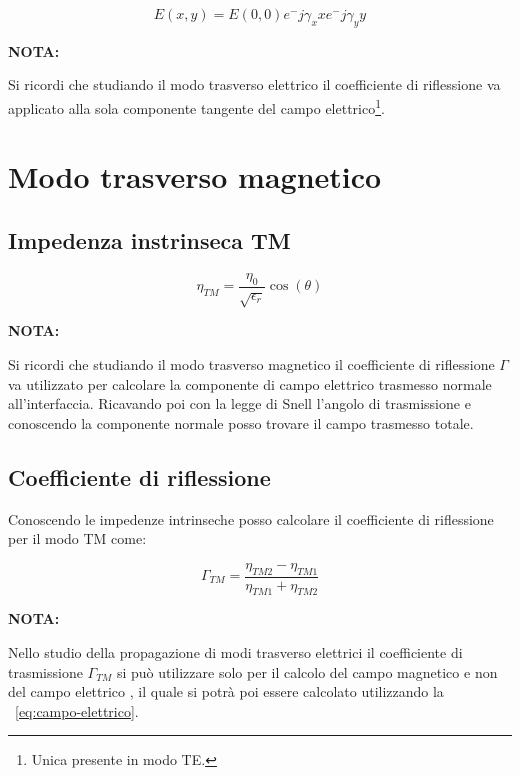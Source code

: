 			\begin{equation}
			E(x,y)=E(0,0)e^-{j\gamma_x x}e^-{j\gamma_y y}
			\end{equation}
		
			\textbf{NOTA:}

			Si ricordi che studiando il modo trasverso elettrico il coefficiente di riflessione va applicato alla sola componente tangente del campo elettrico\footnote{Unica presente in modo TE.}.
			
	\section{Modo trasverso magnetico}

			\subsection{Impedenza instrinseca TM}

				\begin{equation}
					\eta_{TM}=\frac{\eta_0}{\sqrt{\epsilon_r}}\cos(\theta)
				\end{equation}

			\textbf{NOTA:}

			Si ricordi che studiando il modo trasverso magnetico il coefficiente di riflessione $\Gamma$ va utilizzato per calcolare la componente di campo elettrico trasmesso normale all'interfaccia.
			Ricavando poi con la legge di Snell l'angolo di trasmissione e conoscendo la componente normale posso trovare il campo trasmesso totale.

		\subsection{Coefficiente di riflessione}
			Conoscendo le impedenze intrinseche posso calcolare il coefficiente di riflessione per il modo TM come:

			\begin{equation}
			\Gamma_{TM}=\frac{\eta_{TM2}-\eta_{TM1}}{\eta_{TM1}+\eta_{TM2}}
			\end{equation}
		
			 
			 \textbf{ NOTA: }
			 
			 Nello studio della propagazione di modi trasverso elettrici il coefficiente di trasmissione $\Gamma_{TM}$ si può utilizzare solo per il calcolo del campo magnetico e non del campo elettrico , il quale si potrà poi essere calcolato utilizzando la ~\ref{eq:campo-elettrico}.

